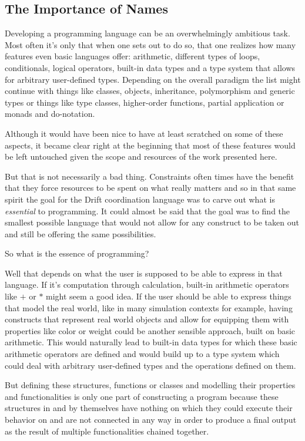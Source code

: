 \subsection{The Importance of Names}
\label{importanceofnames}

Developing a programming language can be an overwhelmingly
ambitious task. Most often it's only that when one sets out
to do so, that one realizes how many features even
basic languages offer: arithmetic, different types of loops,
conditionals, logical operators, built-in data types and a
type system that allows for arbitrary user-defined types.
Depending on the overall paradigm the list might continue
with things like classes, objects, inheritance, polymorphism
and generic types or things like type classes, higher-order
functions, partial application or monads and do-notation.

Although it would have been nice to have at least scratched on
some of these aspects, it became clear right at the beginning
that most of these features would be left untouched given the
scope and resources of the work presented here.

But that is not necessarily a bad thing. Constraints often times
have the benefit that they force resources to be spent on what
really matters and so in that same spirit the goal for the
Drift coordination language was to carve out what is
\textit{essential} to programming. It could almost be said that
the goal was to find the smallest possible language that
would not allow for any construct to be taken out and still be
offering the same possibilities.
\newline

So what is the essence of programming?

Well that depends on what the user is supposed to be able to express
in that language. If it's computation through calculation, built-in
arithmetic operators like $+$ or $*$ might seem a good idea. If
the user should be able to express things that model the real world,
like in many simulation contexts for example, having constructs
that represent real world objects and allow for equipping them with
properties like color or weight could be another sensible approach,
built on basic arithmetic. This would naturally lead to built-in
data types for which these basic arithmetic operators are
defined and would build up to a type system which could deal with
arbitrary user-defined types and the operations defined on them.

But defining these structures, functions or classes and modelling their
properties and functionalities is only one part of constructing
a program because these structures in and by themselves have nothing
on which they could execute their behavior on and are not connected
in any way in order to produce a final output as the result of
multiple functionalities chained together.

